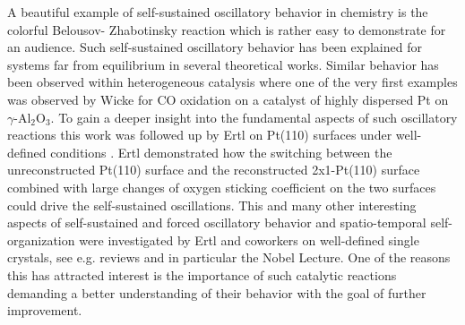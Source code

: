 \documentclass[journal=jacsat,manuscript=article]{achemso}
\begin{document}
A beautiful example of self-sustained oscillatory behavior in chemistry is the
colorful Belousov- Zhabotinsky reaction\cite{ZAIKIN1970} which is rather easy
to demonstrate for an audience. Such self-sustained oscillatory behavior has
been explained for systems far from equilibrium in several theoretical
works\cite{HakenBog,NicolisBog}. Similar behavior has been observed within
heterogeneous catalysis where one of the very first examples was observed by Wicke
for CO oxidation on a catalyst
of highly dispersed Pt on $\gamma$-Al$_2$O$_3$\cite{BEUSCH1972}. To gain a
deeper insight into the fundamental aspects of such oscillatory reactions this
work was followed up by Ertl on Pt(110) surfaces under well-defined conditions
\cite{EISWIRTH1986}. Ertl demonstrated how the switching between the
unreconstructed Pt(110) surface and the reconstructed 2x1-Pt(110) surface
combined with large changes of oxygen sticking coefficient on the two surfaces
could drive the self-sustained oscillations. This and many other interesting
aspects of self-sustained and forced oscillatory behavior and spatio-temporal
self-organization were investigated by Ertl and coworkers on well-defined
single crystals, see e.g. reviews\cite{IMBIHL1995,JAKUBITH1990} and in
particular the Nobel Lecture\cite{Ertl2008}. One of the reasons this has
attracted interest is the importance of such catalytic reactions demanding a
better understanding of their behavior with the goal of further improvement. 
\end{document}
